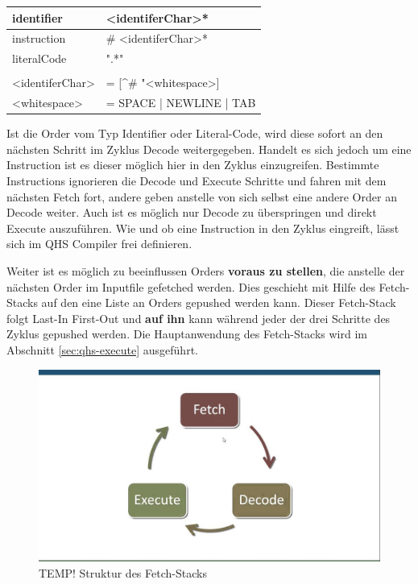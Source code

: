 \begin{table}[h]
    \centering
    \begin{tabular}{ll}
    \multicolumn{1}{l|}{identifier}        & \textless{}identiferChar\textgreater{}*                           \\ \hline
    \multicolumn{1}{l|}{instruction}       & \# \textless{}identiferChar\textgreater{}*                        \\ \hline
    \multicolumn{1}{l|}{literalCode}       & ".*"                                                              \\
                                           &                                                                   \\
    \textless{}identiferChar\textgreater{} & = {[}\textasciicircum{}\# "\textless{}whitespace\textgreater{}{]} \\
    \textless{}whitespace\textgreater{}    & = SPACE | NEWLINE | TAB
    
    \end{tabular}
\end{table}

Ist die Order vom Typ Identifier oder Literal-Code, wird diese sofort an den nächsten Schritt im Zyklus Decode weitergegeben. Handelt es sich jedoch um eine Instruction ist es dieser möglich hier in den Zyklus einzugreifen.
Bestimmte Instructions ignorieren die Decode und Execute Schritte und fahren mit dem nächsten Fetch fort, andere geben anstelle von sich selbst eine andere Order an Decode weiter. Auch ist es möglich nur Decode zu überspringen und
direkt Execute auszuführen. Wie und ob eine Instruction in den Zyklus eingreift, lässt sich im QHS Compiler frei definieren.

Weiter ist es möglich zu beeinflussen Orders \textbf{voraus zu stellen}, die anstelle der nächsten Order im Inputfile gefetched werden. Dies geschieht mit Hilfe des Fetch-Stacks auf den eine Liste an Orders gepushed werden kann.
Dieser Fetch-Stack folgt Last-In First-Out und \textbf{auf ihn} kann während jeder der drei Schritte des Zyklus gepushed werden. Die Hauptanwendung des Fetch-Stacks wird im Abschnitt \ref{sec:qhs-execute} ausgeführt.

\begin{figure}[h!]
    \centering
    \includegraphics[scale=0.3]{resources/TEMP_von-neumann-cycle.jpg}
    \caption{TEMP! Struktur des Fetch-Stacks}
    \label{fig:fetch-stack}
\end{figure}

